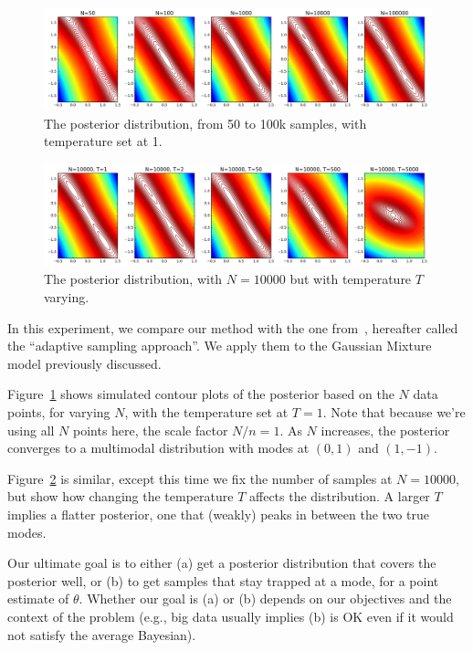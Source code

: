 \documentclass{article}
\begin{document}
\begin{figure}[t]
  \centering
  \includegraphics[width=1\linewidth]{contour_v1}
  \caption{The posterior distribution, from 50 to 100k samples, with temperature set at 1.}
  \label{fig:contour1}
\end{figure}
\begin{figure}[t]
  \centering
  \includegraphics[width=1\linewidth]{contour_v2}
  \caption{The posterior distribution, with $N=10000$ but with temperature $T$ varying.}
  \label{fig:contour2}
\end{figure}

In this experiment, we compare our method with the one from~\cite{cutting_mh_2014}, hereafter called
the ``adaptive sampling approach''. We apply them to the Gaussian Mixture model previously
discussed.

Figure~\ref{fig:contour1} shows simulated contour plots of the posterior based on the $N$ data
points, for varying $N$, with the temperature set at $T=1$. Note that because we're using all $N$
points here, the scale factor $N/n=1$. As $N$ increases, the posterior converges to a multimodal
distribution with modes at $(0,1)$ and $(1,-1)$. 

Figure~\ref{fig:contour2} is similar, except this time we fix the number of samples at $N=10000$,
but show how changing the temperature $T$ affects the distribution. A larger $T$ implies a flatter
posterior, one that (weakly) peaks in between the two true modes.

Our ultimate goal is to either (a) get a posterior distribution that covers the posterior well, or
(b) to get samples that stay trapped at a mode, for a point estimate of $\theta$.  Whether our goal
is (a) or (b) depends on our objectives and the context of the problem (e.g., big data usually
implies (b) is OK even if it would not satisfy the average Bayesian).
\end{document}
